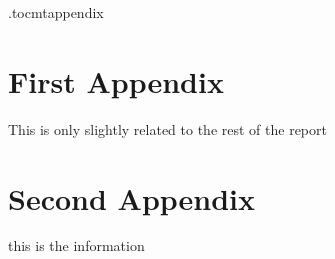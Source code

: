 \newpage
\appendix
\newpage

\etocdepthtag.toc{mtappendix}
\tableofcontents
\pagestyle{plain}
\newpage
{}

\chapter{First Appendix}
This is only slightly related to the rest of the report


\chapter{Second Appendix}
this is the information

